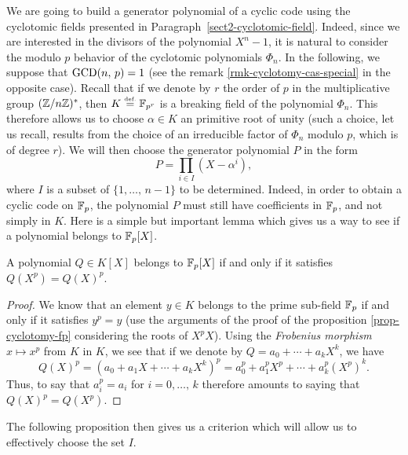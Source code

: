  
We are going to build a generator polynomial of a cyclic code using the cyclotomic fields presented in Paragraph~\ref{sect2-cyclotomic-field}. Indeed, since we are interested in the divisors of the polynomial $ X^n-1 $, it is natural to consider the modulo $ p $ behavior of the cyclotomic polynomials $ \Phi_n $. In the following, we suppose that $ \operatorname{GCD} (n, \, p) = 1 $ (see the remark \ref{rmk-cyclotomy-cas-special} in the opposite case). Recall that if we denote by $ r $ the order of $ p $ in the multiplicative group $ (\mathbb{Z}/n \mathbb{Z})^* $, then $ K \stackrel{\mbox{\upshape\tiny def.}}{=} \mathbb{F}_{p^r} $ is a breaking field of the polynomial $ \Phi_n $. This therefore allows us to choose $ \alpha \in K $ an  primitive root of unity (such a choice, let us recall, results from the choice of an irreducible factor of $ \Phi_n $ modulo $ p $, which is of degree $ r $). We will then choose the generator polynomial $ P $ in the form
\begin{equation}
\label{eq-defn-pol-gen-codes-bch}
P = \prod_{i \in I}{(X- \alpha^i)},
\end{equation}
where $ I $ is a subset of $ \{1, \ldots, \, n-1\} $ to be determined. Indeed, in order to obtain a cyclic code on $ \mathbb{F}_p $, the polynomial $ P $ must still have coefficients in $ \mathbb{F}_p $, and not simply in $ K $. Here is a simple but important lemma which gives us a way to see if a polynomial belongs to $ \mathbb{F}_p [X] $.
 
\begin{lem}
A polynomial $ Q \in K [X] $ belongs to $ \mathbb{F}_p [X] $ if and only if it satisfies $ Q (X^p) = Q (X)^p $.
\end{lem}
\begin{proof}
 We know that an element $ y \in K $ belongs to the prime sub-field $ \mathbb{F}_p $ if and only if it satisfies $ y^p = y $ (use the arguments of the proof of the proposition \ref{prop-cyclotomy-fp} considering the roots of $ X^pX $). Using the \textit{Frobenius morphism} $ x \mapsto x^p $ from $ K $ in $ K $, we see that if we denote by $ Q = a_0 + \cdots + a_k X^k $, we have
\begin{equation}
\label{eq-condition-membership-fp}
Q (X)^p = (a_0 + a_1 X + \cdots + a_k X^k)^p = a_0^p + a_1^p X^p + \cdots + a_k^p (X^{p})^k .
\end{equation}
Thus, to say that $ a_i^p = a_i $ for $ i = 0, \ldots, \, k $ therefore amounts to saying that $ Q (X)^p = Q (X^p) $.
\end{proof}
The following proposition then gives us a criterion which will allow us to effectively choose the set $ I $.
 
